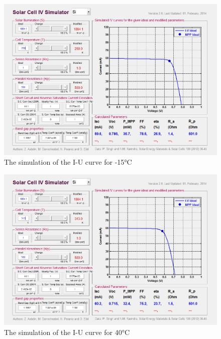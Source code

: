 \documentclass[a4paper, 12pt]{scrartcl}
\begin{document}
\begin{figure}[H]\centering\includegraphics[scale=0.4]{-15 degree}\caption{The simulation of the I-U curve for -15°C}\end{figure}

\begin{figure}[H]\centering\includegraphics[scale=0.4]{40 degree}\caption{The simulation of the I-U curve for 40°C}\end{figure}
\end{document}
